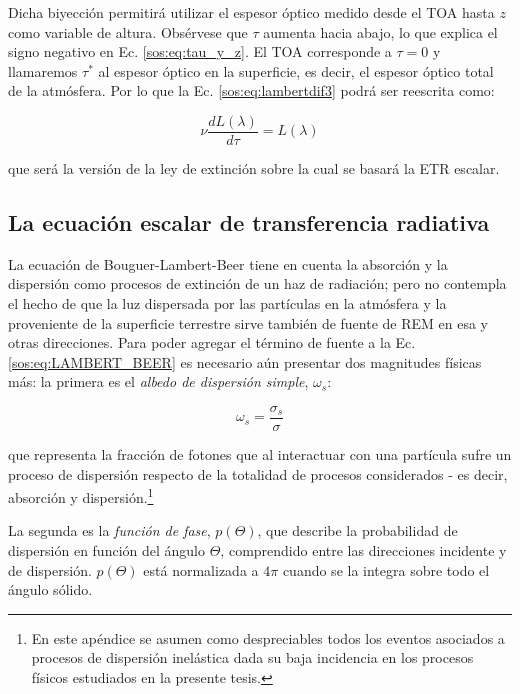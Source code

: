         Dicha biyección permitirá utilizar el espesor óptico medido desde el TOA hasta $z$ como variable de altura. Obsérvese que $\tau$ aumenta hacia abajo, lo que explica el signo negativo en Ec. \ref{sos:eq:tau_y_z}. El TOA corresponde a $\tau=0$ y llamaremos $\tau^{*}$ al espesor óptico en la superficie, es decir, el espesor óptico total de la atmósfera. Por lo que la Ec. \ref{sos:eq:lambertdif3} podrá ser reescrita como:
        
        \begin{equation}
        \boxed{\nu \frac{d L(\lambda)}{d\tau}=L(\lambda)}
        \label{sos:eq:LAMBERT_BEER}
        \end{equation}
        
        \noindent que será la versión de la ley de extinción sobre la cual se basará la ETR escalar.

    \subsection{La ecuación escalar de transferencia radiativa}
    \label{sos:s:EETR}
        
        La ecuación de Bouguer-Lambert-Beer tiene en cuenta la absorción y la dispersión como procesos de extinción de un haz de radiación; pero no contempla el hecho de que la luz dispersada por las partículas en la atmósfera y la proveniente de la superficie terrestre sirve también de fuente de REM en esa y otras direcciones. Para poder agregar el término de fuente a la Ec. \ref{sos:eq:LAMBERT_BEER} es necesario aún presentar dos magnitudes físicas más: la primera es el \textit{albedo de dispersión simple}, $\omega_{s}$: 
        
        \begin{equation}
         \omega_{s}=\frac{\sigma_{s}}{\sigma}
        \label{sos:eq:lenoble2}
         \end{equation}
        
        \noindent que representa la fracción de fotones que al interactuar con una partícula sufre un proceso de dispersión respecto de la totalidad de procesos considerados - es decir, absorción y dispersión.\footnote{En este apéndice se asumen como despreciables todos los eventos asociados a procesos de dispersión inelástica dada su baja incidencia en los procesos físicos estudiados en la presente tesis.}
         
        La segunda es la \textit{función de fase}, $p(\Theta)$, que describe la probabilidad de dispersión en función del ángulo $\Theta$, comprendido entre las direcciones incidente y de dispersión. $p(\Theta)$ está normalizada a $4\pi$ cuando se la integra sobre todo el ángulo sólido.
        
